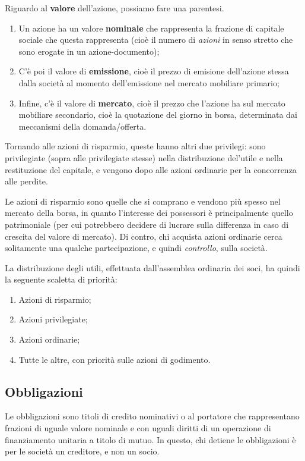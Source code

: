 \documentclass[a4paper,11pt]{article}
\begin{document}
\begin{itemize}
\begin{itemize}
				Riguardo al \textbf{valore} dell'azione, possiamo fare una parentesi.
				\begin{enumerate}
					\item Un azione ha un valore \textbf{nominale} che rappresenta la frazione di capitale sociale che questa rappresenta (cioè il numero di \textit{azioni} in senso stretto che sono erogate in un azione-documento);
					\item C'è poi il valore di \textbf{emissione}, cioè il prezzo di emisione dell'azione stessa dalla società al momento dell'emissione nel mercato mobiliare primario;
					\item Infine, c'è il valore di \textbf{mercato}, cioè il prezzo che l'azione ha sul mercato mobiliare secondario, cioè la quotazione del giorno in borsa, determinata dai meccanismi della domanda/offerta.
				\end{enumerate}

				Tornando alle azioni di risparmio, queste hanno altri due privilegi: sono privilegiate (sopra alle privilegiate stesse) nella distribuzione del'utile e nella restituzione del capitale, e vengono dopo alle azioni ordinarie per la concorrenza alle perdite.

				Le azioni di risparmio sono quelle che si comprano e vendono più spesso nel mercato della borsa, in quanto l'interesse dei possessori è principalmente quello patrimoniale (per cui potrebbero decidere di lucrare sulla differenza in caso di crescita del valore di mercato).
				Di contro, chi acquista azioni ordinarie cerca solitamente una qualche partecipazione, e quindi \textit{controllo}, sulla società. 
		\end{itemize}
\end{itemize}

La distribuzione degli utili, effettuata dall'assemblea ordinaria dei soci, ha quindi la seguente scaletta di priorità:
\begin{enumerate}
	\item Azioni di risparmio;
	\item Azioni privilegiate;
	\item Azioni ordinarie;
	\item Tutte le altre, con priorità sulle azioni di godimento. 
\end{enumerate}

\subsection{Obbligazioni}
Le obbligazioni sono titoli di credito nominativi o al portatore che rappresentano frazioni di uguale valore nominale e con uguali diritti di un operazione di finanziamento unitaria a titolo di mutuo.
In questo, chi detiene le obbligazioni è per le società un creditore, e non un socio.
\end{document}
